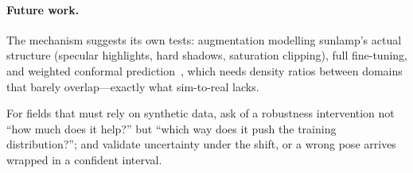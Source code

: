 \documentclass{article}
\begin{document}
\paragraph{Future work.} The mechanism suggests its own tests: augmentation modelling
sunlamp's actual structure (specular highlights, hard shadows, saturation clipping), full
fine-tuning, and weighted conformal prediction~\citep{tibshirani2019covariate}, which
needs density ratios between domains that barely overlap---exactly what sim-to-real lacks.

For fields that must rely on synthetic data, ask of a robustness intervention not
``how much does it help?'' but ``which way does it push the training distribution?'';
and validate uncertainty under the shift, or a wrong pose arrives wrapped in a confident
interval.





\newpage


\newpage


\end{document}
